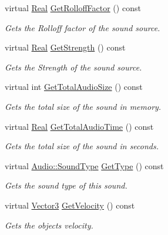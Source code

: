 \begin{DoxyCompactItemize}
virtual \hyperlink{namespaceMezzanine_a726731b1a7df72bf3583e4a97282c6f6}{Real} \hyperlink{classMezzanine_1_1Audio_1_1Sound_a89751ce8cd36d57b6214c89b7d6a878c}{GetRolloffFactor} () const 
\begin{DoxyCompactList}\small\item\em Gets the Rolloff factor of the sound source. \item\end{DoxyCompactList}\item 
virtual \hyperlink{namespaceMezzanine_a726731b1a7df72bf3583e4a97282c6f6}{Real} \hyperlink{classMezzanine_1_1Audio_1_1Sound_afd8808de9c5b5e6b6f150d0d40455dc0}{GetStrength} () const 
\begin{DoxyCompactList}\small\item\em Gets the Strength of the sound source. \item\end{DoxyCompactList}\item 
virtual int \hyperlink{classMezzanine_1_1Audio_1_1Sound_a25ea84a94dc52a85adee4a407fb5147a}{GetTotalAudioSize} () const 
\begin{DoxyCompactList}\small\item\em Gets the total size of the sound in memory. \item\end{DoxyCompactList}\item 
virtual \hyperlink{namespaceMezzanine_a726731b1a7df72bf3583e4a97282c6f6}{Real} \hyperlink{classMezzanine_1_1Audio_1_1Sound_ae467acd6b7fc2aa594de666bec4e6dab}{GetTotalAudioTime} () const 
\begin{DoxyCompactList}\small\item\em Gets the total size of the sound in seconds. \item\end{DoxyCompactList}\item 
virtual \hyperlink{namespaceMezzanine_1_1Audio_a316b2244b8be1a8c441a39b0a246295e}{Audio::SoundType} \hyperlink{classMezzanine_1_1Audio_1_1Sound_afab6416b8ec5570568c2c1ebdc5cc398}{GetType} () const 
\begin{DoxyCompactList}\small\item\em Gets the sound type of this sound. \item\end{DoxyCompactList}\item 
virtual \hyperlink{classMezzanine_1_1Vector3}{Vector3} \hyperlink{classMezzanine_1_1Audio_1_1Sound_ac612c81165beadf27da635095bd82bb2}{GetVelocity} () const 
\begin{DoxyCompactList}\small\item\em Gets the objects velocity. \item\end{DoxyCompactList}\item 

\end{DoxyCompactItemize}
